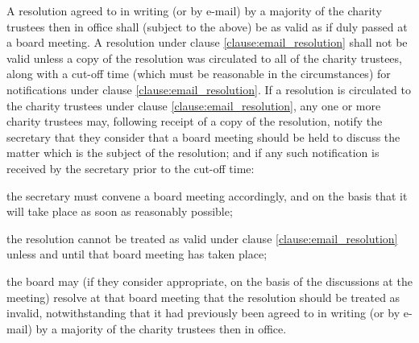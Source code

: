 ﻿\documentclass[a4paper,11pt,onecolumn ]{article}
\begin{document}
\begin{legal}
\item \label{clause:email_resolution} A resolution agreed to in writing (or by e-mail) by a majority of the charity trustees then in office shall (subject to the above) be as valid as if duly passed at a board meeting. A resolution under clause \ref{clause:email_resolution} shall not be valid unless a copy of the resolution was circulated to all of the charity trustees, along with a cut-off time (which must be reasonable in the circumstances) for notifications under clause \ref{clause:email_resolution}. If a resolution is circulated to the charity trustees under clause \ref{clause:email_resolution}, any one or more charity trustees may, following receipt of a copy of the resolution, notify the secretary that they consider that a board meeting should be held to discuss the matter which is the subject of the resolution; and if any such notification is received by the secretary prior to the cut-off time: 
    \begin{legal}[label=\alph*)]
    \item the secretary must convene a board meeting accordingly, and on the basis that it will take place as soon as reasonably possible;
    \item the resolution cannot be treated as valid under clause \ref{clause:email_resolution} unless and until that board meeting has taken place; 
    \item the board may (if they consider appropriate, on the basis of the discussions at the meeting) resolve at that board meeting that the resolution should be treated as invalid, notwithstanding that it had previously been agreed to in writing (or by e-mail) by a majority of the charity trustees then in office.
    \end{legal}
\end{legal}
\end{document}
